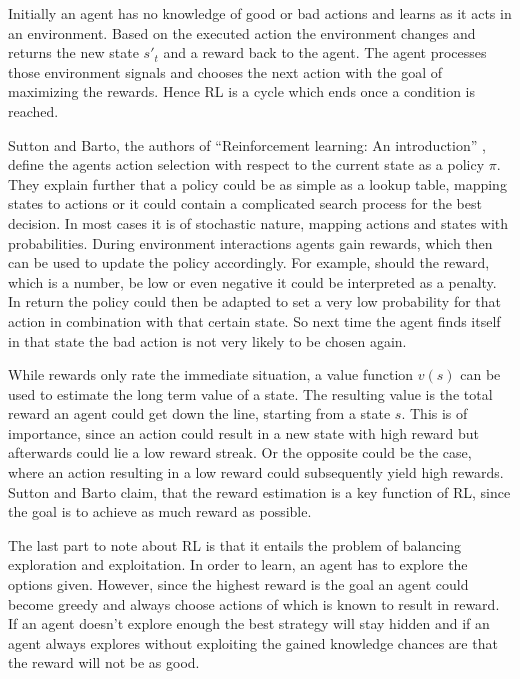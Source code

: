 Initially an agent has no knowledge of good or bad actions and learns as it acts in an
environment. Based on the executed action the environment changes and returns the new
state $s'_{t}$ and a reward back to the agent. The agent processes those environment
signals and chooses the next action with the goal of maximizing the rewards. Hence
RL is a cycle which ends once a condition is reached.

Sutton and Barto, the authors of ``Reinforcement learning: An introduction'' \cite{suba18},
define the agents action selection with respect to the current state as a policy $\pi$.
They explain further that a policy could be as simple as a lookup table, mapping
states to actions or it could contain a complicated search process for the best
decision. In most cases it is of stochastic nature, mapping actions and states with
probabilities. During environment interactions agents gain rewards, which then can be
used to update the policy accordingly. For example, should the reward, which is a number,
be low or even negative it could be interpreted as a penalty. In return the policy
could then be adapted to set a very low probability for that action in combination with
that certain state. So next time the agent finds itself in that state the bad action is
not very likely to be chosen again.

While rewards only rate the immediate situation, a value function $v(s)$ can be
used to estimate the long term value of a state. The resulting value is the total reward
an agent could get down the line,
starting from a state $s$. This is of importance, since an action
could result in a new state with high reward but afterwards could lie a low reward
streak. Or the opposite could be the case, where an action resulting in a low reward
could subsequently yield high rewards. Sutton and Barto claim, that the reward estimation
is a key function of RL, since the goal is to achieve as much reward as possible.

The last part to note about RL is that it entails the problem of balancing
exploration and exploitation. In order to learn, an agent has to explore the options
given. However, since the highest reward is the goal an agent could become greedy
and always choose actions of which is known to result in reward. If an agent doesn't
explore enough the best strategy will stay hidden and if an agent always explores
without exploiting the gained knowledge chances are that the reward will not be as good.

